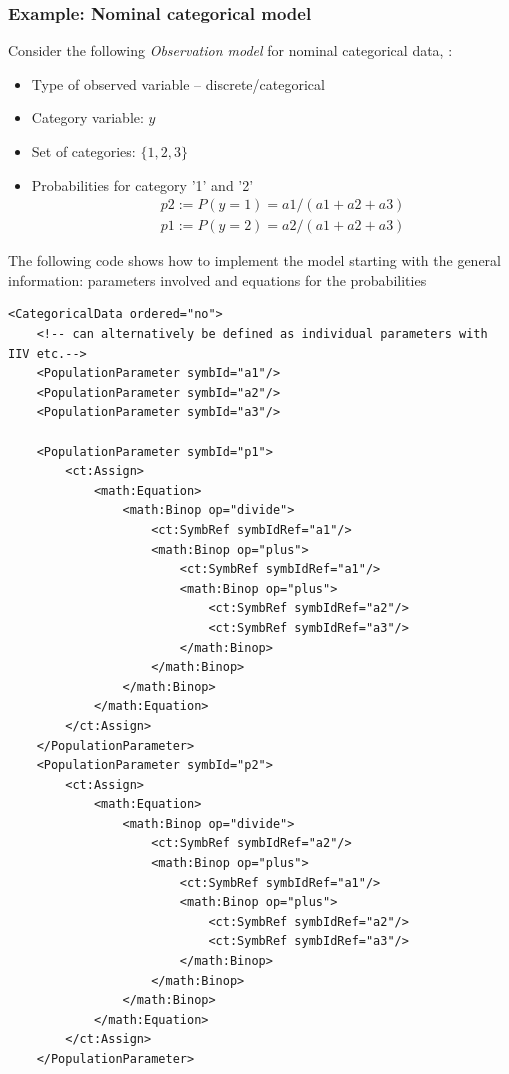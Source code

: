  
\subsubsection{Example: Nominal categorical model}

Consider the following \emph{Observation model} for nominal categorical 
data, \cite{Swat:2014bb}:

\begin{itemize}
\item
Type of observed variable -- discrete/categorical
\item
Category variable: $y$
\item
Set of categories: $\{1,2,3\}$
\item
Probabilities for category '1' and '2'
\begin{eqnarray}
&& p2 := P(y=1) = a1/(a1+a2+a3)  \nonumber \\
&& p1 := P(y=2) = a2/(a1+a2+a3)  \nonumber 
\end{eqnarray}
\end{itemize}
The following code shows how to implement the model 
starting with the general information: parameters involved and equations
for the probabilities 
\lstset{language=XML}
\begin{lstlisting}
<CategoricalData ordered="no">
    <!-- can alternatively be defined as individual parameters with IIV etc.-->
    <PopulationParameter symbId="a1"/> 
    <PopulationParameter symbId="a2"/>
    <PopulationParameter symbId="a3"/>
    
    <PopulationParameter symbId="p1">
        <ct:Assign>
            <math:Equation>
                <math:Binop op="divide">
                    <ct:SymbRef symbIdRef="a1"/>
                    <math:Binop op="plus">
                        <ct:SymbRef symbIdRef="a1"/>
                        <math:Binop op="plus">
                            <ct:SymbRef symbIdRef="a2"/>
                            <ct:SymbRef symbIdRef="a3"/>
                        </math:Binop>
                    </math:Binop>
                </math:Binop>
            </math:Equation>
        </ct:Assign>
    </PopulationParameter>
    <PopulationParameter symbId="p2">
        <ct:Assign>
            <math:Equation>
                <math:Binop op="divide">
                    <ct:SymbRef symbIdRef="a2"/>
                    <math:Binop op="plus">
                        <ct:SymbRef symbIdRef="a1"/>
                        <math:Binop op="plus">
                            <ct:SymbRef symbIdRef="a2"/>
                            <ct:SymbRef symbIdRef="a3"/>
                        </math:Binop>
                    </math:Binop>
                </math:Binop>
            </math:Equation>
        </ct:Assign>
    </PopulationParameter>
\end{lstlisting}
